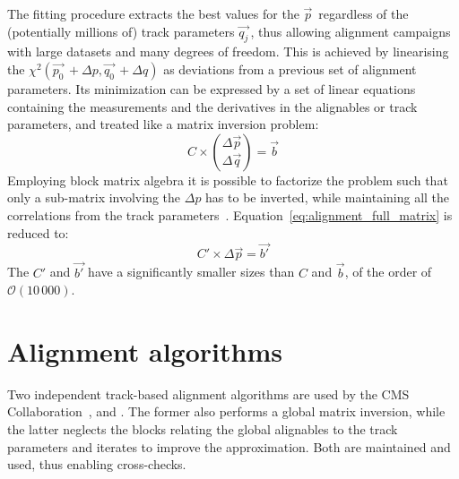 The fitting procedure extracts the best values for the $\vec{p}\,$ regardless of the (potentially millions of) track parameters $\vec{q_j}\,$,
thus allowing alignment campaigns with large datasets and many degrees of freedom.
This is achieved by linearising the $\chi^2(\vec{p_0}\,+\Delta p, \vec{q_0}\,+\Delta q)$ as deviations from a previous set of alignment parameters.
Its minimization can be expressed by a set of linear equations containing the measurements and the derivatives in the alignables or track parameters,
and treated like a matrix inversion problem:
\begin{equation}
  \label{eq:alignment_full_matrix}
  C \times \binom{\Delta\vec{p}}{\Delta\vec{q}} = \vec{b}
\end{equation}
Employing block matrix algebra it is possible to factorize the problem such that only a sub-matrix involving the $\Delta p$ has to be inverted,
while maintaining all the correlations from the track parameters~\cite{blobel2002new}.
Equation~\ref{eq:alignment_full_matrix} is reduced to:
\begin{equation}
  \label{eq:alignment_reduced_matrix}
  C' \times \Delta\vec{p} = \vec{b'}
\end{equation}
The $C'$ and $\vec{b'}$ have a significantly smaller sizes than $C$ and $\vec{b}$,
of the order of $\mathcal{O}(10\,000)$.

\section{Alignment algorithms}
Two independent track-based alignment algorithms are used by the CMS Collaboration~\cite{CMS-TRK-20-001}, \MPII and \HIPPY.
The former also performs a global matrix inversion, while the latter neglects the blocks
relating the global alignables to the track parameters and iterates to improve the approximation.
Both are maintained and used, thus enabling cross-checks.

